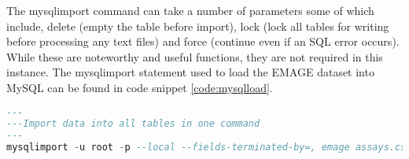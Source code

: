 The mysqlimport command can take a number of parameters some of which include, delete (empty the table before import), lock (lock all tables for writing before processing any text files) and force (continue even if an SQL error occurs). While these are noteworthy and useful functions, they are not required in this instance. The mysqlimport statement used to load the EMAGE dataset into MySQL can be found in code snippet \ref{code:mysqlload}.
\begin{lstlisting}[language=SQL, caption=Example LOAD DATA INFILE statement., label=code:mysqlload]
---
---Import data into all tables in one command
---
mysqlimport -u root -p --local --fields-terminated-by=, emage assays.csv publications.csv sources.csv specimens.csv stages.csv textannotations.csv genes.csv anatomystructures.csv

\end{lstlisting}








